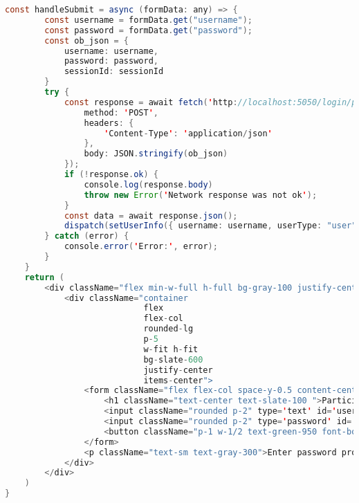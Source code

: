 \begin{lstlisting}[language=Java, caption={Chat Page Component}, label={lst:java}]
    const handleSubmit = async (formData: any) => {
        const username = formData.get("username");
        const password = formData.get("password");
        const ob_json = {
            username: username,
            password: password,
            sessionId: sessionId
        }
        try {
            const response = await fetch('http://localhost:5050/login/participant', {
                method: 'POST',
                headers: {
                    'Content-Type': 'application/json'
                },
                body: JSON.stringify(ob_json)
            });
            if (!response.ok) {
                console.log(response.body)
                throw new Error('Network response was not ok');
            }
            const data = await response.json();
            dispatch(setUserInfo({ username: username, userType: "user", isLoggedIn: true, sessionId: sessionId }));
        } catch (error) {
            console.error('Error:', error);
        }
    }
    return (
        <div className="flex min-w-full h-full bg-gray-100 justify-center items-center content-center">
            <div className="container 
                            flex 
                            flex-col 
                            rounded-lg
                            p-5 
                            w-fit h-fit 
                            bg-slate-600
                            justify-center 
                            items-center">
                <form className="flex flex-col space-y-0.5 content-center items-center" action={handleSubmit}>
                    <h1 className="text-center text-slate-100 ">Participant Login</h1>
                    <input className="rounded p-2" type='text' id='username' placeholder="username" name='username' required /><br />
                    <input className="rounded p-2" type='password' id='password' placeholder="password" name='password' required /><br />
                    <button className="p-1 w-1/2 text-green-950 font-bold bg-green-400 rounded place-self-center" type="submit">Submit</button>
                </form>
                <p className="text-sm text-gray-300">Enter password provided by instructor or TA</p>
            </div>
        </div>
    )
}
\end{lstlisting}
